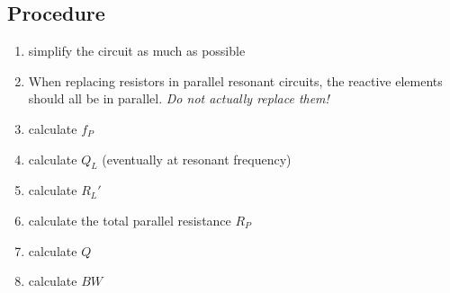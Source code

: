 	
	\subsection{Procedure} %
		\begin{enumerate}
			\item simplify the circuit as much as possible
			\item When replacing resistors in parallel resonant circuits, the reactive elements should all be in parallel. \emph{Do not actually replace them!}
			\item calculate $f_P$
			\item calculate $Q_L$ (eventually at resonant frequency)
			\item calculate $R_L'$
			\item calculate the total parallel resistance $R_P$
			\item calculate $Q$
			\item calculate $BW$
		\end{enumerate}
	

